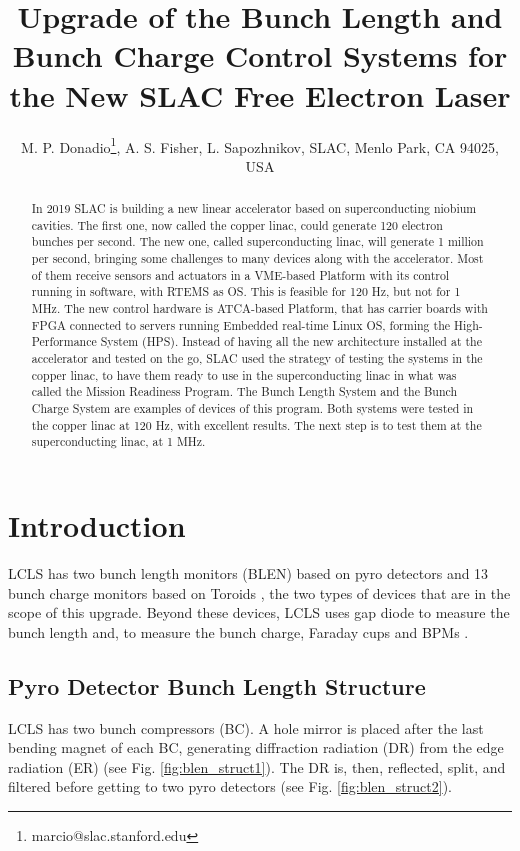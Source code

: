 \documentclass[letter,
        biblatex,   %
        keeplastbox,  %
        ]{jacow}
\begin{document}
\title{Upgrade of the Bunch Length and Bunch Charge Control Systems for the New SLAC Free Electron Laser}

\author{M. P. Donadio\thanks{marcio@slac.stanford.edu}, A. S. Fisher, L. Sapozhnikov, SLAC, Menlo Park, CA 94025, USA}
	
\maketitle


\begin{abstract}
In 2019 SLAC is building a new linear accelerator based on superconducting niobium cavities. The first one, now called the copper linac, could generate 120 electron bunches per second. The new one, called superconducting linac, will generate 1 million per second, bringing some challenges to many devices along with the accelerator. Most of them receive sensors and actuators in a VME-based Platform with its control running in software, with RTEMS as OS. This is feasible for 120 Hz, but not for 1 MHz. The new control hardware is ATCA-based Platform, that has carrier boards with FPGA connected to servers running Embedded real-time Linux OS, forming the High-Performance System (HPS). Instead of having all the new architecture installed at the accelerator and tested on the go, SLAC used the strategy of testing the systems in the copper linac, to have them ready to use in the superconducting linac in what was called the Mission Readiness Program. The Bunch Length System and the Bunch Charge System are examples of devices of this program. Both systems were tested in the copper linac at 120 Hz, with excellent results. The next step is to test them at the superconducting linac, at 1 MHz.
\end{abstract}


\section{Introduction}
LCLS has two bunch length monitors (BLEN) based on pyro detectors \cite{blen-pac07} and 13 bunch charge monitors based on Toroids \cite{slac-toroids}, the two types of devices that are in the scope of this upgrade. Beyond these devices, LCLS uses gap diode to measure the bunch length \cite{injector-commissioning-2007} and, to measure the bunch charge, Faraday cups \cite{slac-toroids} and BPMs \cite{beam-measurement}.

\subsection{Pyro Detector Bunch Length Structure}
LCLS has two bunch compressors (BC). A hole mirror is placed after the last bending magnet of each BC, generating diffraction radiation (DR) from the edge radiation (ER) (see Fig. \ref{fig:blen_struct1}). The DR is, then, reflected, split, and filtered before getting to two pyro detectors (see Fig. \ref{fig:blen_struct2}). \cite{blen-pac07}
\end{document}
